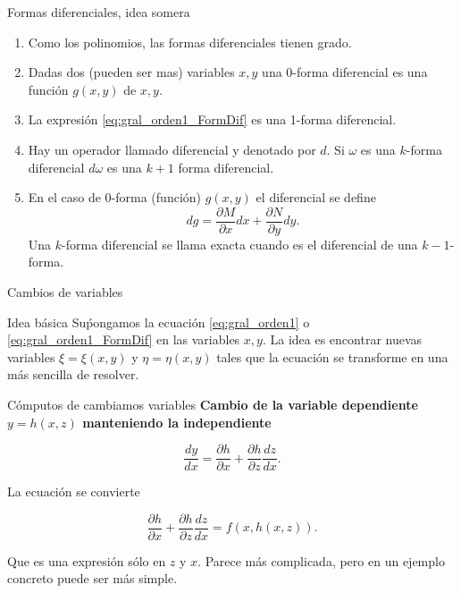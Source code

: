 \documentclass[handout,hyperref={colorlinks=true}]{beamer}
\begin{document}
\begin{frame}{Formas diferenciales, idea somera}


\begin{enumerate}
\item<+-> Como los polinomios, las formas diferenciales tienen grado. 
\item<+-> Dadas dos (pueden ser mas) variables $x,y$ una 0-forma diferencial es una función $g(x,y)$ de $x,y$. 
\item<+> La expresión \eqref{eq:gral_orden1_FormDif} es una 1-forma diferencial.
\item<+-> Hay un operador llamado diferencial y denotado por $d$. Si $\omega$ es una $k$-forma diferencial $d\omega$ es una $k+1$ forma diferencial.
\item<+-> En el caso de $0$-forma (función) $g(x,y)$ el diferencial se define
\[dg=\frac{\partial M}{\partial x}dx+ \frac{\partial N}{\partial y}dy.\]
Una $k$-forma diferencial se llama exacta cuando es el diferencial de una $k-1$-forma.
\end{enumerate}


\end{frame}

\begin{frame}{Cambios de variables}

\begin{block}{Idea básica}
 Suṕongamos la ecuación \eqref{eq:gral_orden1} o \eqref{eq:gral_orden1_FormDif} en las variables $x,y$. La idea es encontrar nuevas variables $\xi=\xi(x,y)$ y $\eta=\eta(x,y)$ tales que la ecuación se transforme en una más sencilla de resolver. 
\end{block}




\end{frame}

\begin{frame}{Cómputos de cambiamos variables}
\textbf{Cambio de la variable dependiente $y=h(x,z)$ manteniendo la independiente} 

\[\frac{dy}{dx}=\frac{\partial h}{\partial x}+\frac{\partial h}{\partial z}\frac{dz}{dx}.\]

La ecuación se convierte

\[\frac{\partial h}{\partial x}+\frac{\partial h}{\partial z}\frac{dz}{dx}=f(x,h(x,z)).\]

Que es una expresión sólo en $z$ y $x$. Parece más complicada, pero en un ejemplo concreto puede ser más simple.



\end{frame}
\end{document}
